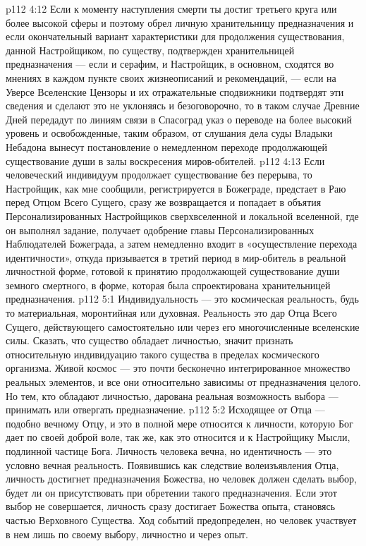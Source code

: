 \vs p112 4:12 \pc Если к моменту наступления смерти ты достиг третьего круга или более высокой сферы и поэтому обрел личную хранительницу предназначения и если окончательный вариант характеристики для продолжения существования, данной Настройщиком, по существу, подтвержден хранительницей предназначения --- если и серафим, и Настройщик, в основном, сходятся во мнениях в каждом пункте своих жизнеописаний и рекомендаций, --- если на Уверсе Вселенские Цензоры и их отражательные сподвижники подтвердят эти сведения и сделают это не уклоняясь и безоговорочно, то в таком случае Древние Дней передадут по линиям связи в Спасоград указ о переводе на более высокий уровень и освобожденные, таким образом, от слушания дела суды Владыки Небадона вынесут постановление о немедленном переходе продолжающей существование души в залы воскресения миров\hyp{}обителей.
\vs p112 4:13 Если человеческий индивидуум продолжает существование без перерыва, то Настройщик, как мне сообщили, регистрируется в Божеграде, предстает в Раю перед Отцом Всего Сущего, сразу же возвращается и попадает в объятия Персонализированных Настройщиков сверхвселенной и локальной вселенной, где он выполнял задание, получает одобрение главы Персонализированных Наблюдателей Божеграда, а затем немедленно входит в «осуществление перехода идентичности», откуда призывается в третий период в мир\hyp{}обитель в реальной личностной форме, готовой к принятию продолжающей существование души земного смертного, в форме, которая была спроектирована хранительницей предназначения.
\vs p112 5:1 Индивидуальность --- это космическая реальность, будь то материальная, моронтийная или духовная. Реальность  это дар Отца Всего Сущего, действующего самостоятельно или через его многочисленные вселенские силы. Сказать, что существо обладает личностью, значит признать относительную индивидуацию такого существа в пределах космического организма. Живой космос --- это почти бесконечно интегрированное множество реальных элементов, и все они относительно зависимы от предназначения целого. Но тем, кто обладают личностью, дарована реальная возможность выбора --- принимать или отвергать предназначение.
\vs p112 5:2 Исходящее от Отца --- подобно вечному Отцу, и это в полной мере относится к личности, которую Бог дает по своей доброй воле, так же, как это относится и к Настройщику Мысли, подлинной частице Бога. Личность человека вечна, но идентичность --- это условно вечная реальность. Появившись как следствие волеизъявления Отца, личность достигнет предназначения Божества, но человек должен сделать выбор, будет ли он присутствовать при обретении такого предназначения. Если этот выбор не совершается, личность сразу достигает Божества опыта, становясь частью Верховного Существа. Ход событий предопределен, но человек участвует в нем лишь по своему выбору, личностно и через опыт.
